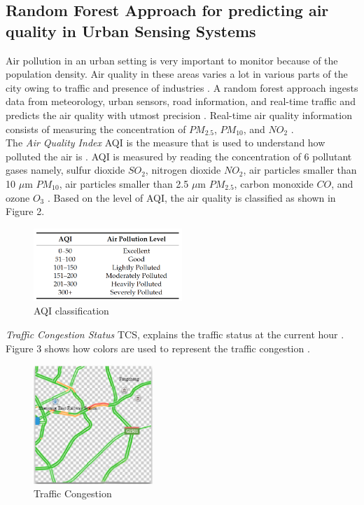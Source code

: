 \documentclass[sigconf]{acmart}
\begin{document}
\subsection{Random Forest Approach for predicting air quality in Urban Sensing Systems}
Air pollution in an urban setting is very important to monitor because of the population density. Air quality in these areas varies a lot in various parts of the city owing to traffic and presence of industries \cite{raq2016}. A random forest approach ingests data from meteorology, urban sensors, road information, and real-time traffic and predicts the air quality with utmost precision \cite{raq2016}. Real-time air quality information consists of measuring the concentration of $PM_{2.5}$, $PM_{10}$, and $NO_{2}$ \cite{raq2016}. \\
The {\em Air Quality Index} AQI is the measure that is used to understand how polluted the air is \cite{raq2016}. AQI is measured by reading the concentration of 6 pollutant gases namely, sulfur dioxide $SO_{2}$, nitrogen dioxide $NO_{2}$, air particles smaller than 10 $\mu$m $PM_{10}$, air particles smaller than 2.5 $\mu$m $PM_{2.5}$, carbon monoxide $CO$, and ozone $O_3$ \cite{raq2016}. Based on the level of AQI, the air quality is classified as shown in Figure 2. 

\begin{figure}
\includegraphics[width=0.5\textwidth]{images/fig2.png}
\caption{AQI classification \cite{raq2016}}
\end{figure}

{\em Traffic Congestion Status} TCS, explains the traffic status at the current hour \cite{raq2016}. Figure 3 shows how colors are used to represent the traffic congestion \cite{raq2016}.

\begin{figure}
\includegraphics[width=0.4\textwidth]{images/fig3.png}
\caption{Traffic Congestion\cite{raq2016}}
\end{figure}
\end{document}
